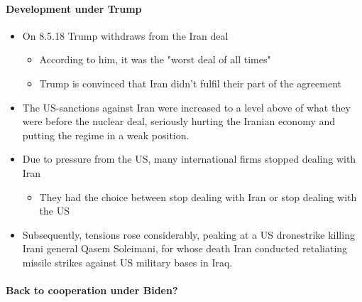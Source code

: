 \paragraph{Development under Trump}

\begin{itemize}
    \item On 8.5.18 Trump withdraws from the Iran deal
        \begin{itemize}
            \item According to him, it was the "worst deal of all times"
            \item Trump is convinced that Iran didn't fulfil their part of
                the agreement
        \end{itemize}
    \item The US-sanctions against Iran were increased to a level above of
        what they were before the nuclear deal, seriously hurting the Iranian
        economy and putting the regime in a weak position.
    \item Due to pressure from the US, many international firms stopped
        dealing with Iran
        \begin{itemize}
            \item They had the choice between stop dealing with Iran
                or stop dealing with the US
        \end{itemize}
    \item Subsequently, tensions rose considerably, peaking at a US dronestrike
        killing Irani general Qasem Soleimani, for whose death Iran conducted
        retaliating missile strikes against US military bases in Iraq.
\end{itemize}

\paragraph{Back to cooperation under Biden?}


